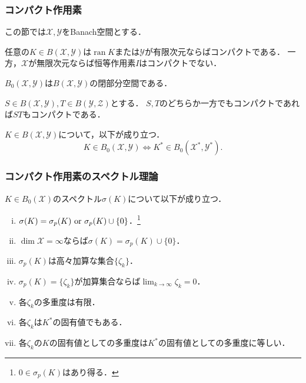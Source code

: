 \documentclass[a4j]{jsarticle}
\newcommand{\ran}{\operatorname{ran}}
\newcommand{\ind}{\operatorname{ind}}
\newcommand{\spX}{\mathscr{X}}
\newcommand{\spY}{\mathscr{Y}}
\newcommand{\spZ}{\mathscr{Z}}
\begin{document}
    \subsubsection{コンパクト作用素}
    この節では$\spX, \spY$をBanach空間とする．
    \begin{Prop}[p.257,p.261] \label{prop-cmp}
        任意の$K \in B(\spX,\spY)$は$\ran K$または$\spY$が有限次元ならばコンパクトである．
        一方，$\spX$が無限次元ならば恒等作用素$I$はコンパクトでない．
    \end{Prop}
    \begin{Thm}[定理11.12, p.257] \label{them1112}
        $B_0(\spX,\spY)$は$B(\spX,\spY)$の閉部分空間である．
    \end{Thm}
    \begin{Thm}[定理11.13, p.258] \label{them1113}
        $S \in B(\spX, \spY), T \in B(\spY,\spZ)$とする．
        $S,T$のどちらか一方でもコンパクトであれば$ST$もコンパクトである．
    \end{Thm}
    \begin{Thm}[Schauderの定理, 定理11.15, p.258] \label{them1115}
        $K \in B(\spX,\spY)$について，以下が成り立つ．
        \[ K \in B_0(\spX,\spY) \iff K^* \in B_0(\spX^*,\spY^*). \]
    \end{Thm}

    \subsubsection{コンパクト作用素のスペクトル理論}
    \begin{Thm}[定理11.29, p.269] \label{them1129}
        $K \in B_0(\spX)$のスペクトル$\sigma(K)$について以下が成り立つ．
        \begin{enumerate}[i)]
            \item $\sigma(K)=\sigma_p(K) \text{ or } \sigma_p(K) \cup \{0\}$．\footnote{$0 \in \sigma_p(K)$はあり得る．}
            \item $\dim \spX=\infty$ならば$\sigma(K)=\sigma_p(K) \cup \{0\}$．
            \item $\sigma_p(K)$は高々加算な集合$\{\zeta_k\}$．
            \item $\sigma_p(K)=\{\zeta_k\}$が加算集合ならば$\lim_{k \to \infty}\zeta_k=0$．
            \item 各$\zeta_k$の多重度は有限．
            \item 各$\zeta_k$は$K^*$の固有値でもある．
            \item 各$\zeta_k$の$K$の固有値としての多重度は$K^*$の固有値としての多重度に等しい．
        \end{enumerate}
    \end{Thm}
\end{document}
